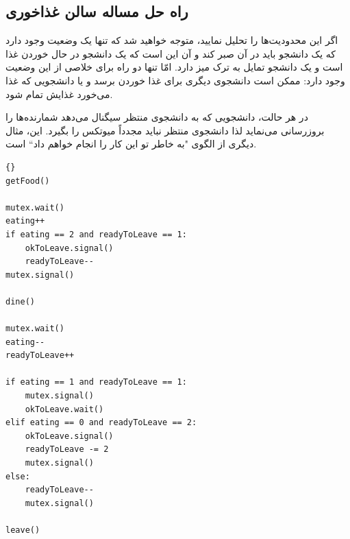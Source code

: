 \documentclass{book}
\newcommand{\clearemptydoublepage}{\newpage\cleardoublepage}
\begin{document}
\clearemptydoublepage
\subsection{راه حل مساله سالن غذاخوری}

    اگر این محدودیت‌ها را تحلیل نمایید، متوجه خواهید شد که تنها یک وضعیت وجود دارد که یک دانشجو باید در آن صبر کند و آن این است که یک 
    دانشجو در حال خوردن غذا است و یک دانشجو تمایل به ترک میز دارد. امّا تنها دو راه برای خلاصی از این وضعیت وجود دارد:
    ممکن است دانشجوی دیگری برای غذا خوردن برسد و یا دانشجویی که غذا می‌خورد غذایش تمام شود. 

    در هر حالت، دانشجویی که به دانشجوی منتظر سیگنال می‌دهد شمارنده‌ها را بروزرسانی می‌نماید لذا دانشجوی منتظر نباید مجدداً میوتکس را بگیرد. 
    این، مثال دیگری از الگوی "به خاطر تو این کار را انجام خواهم داد`` است.

\begin{latin}
\begin{lstlisting}[title=\rl{راه حل مساله سالن غذاخوری}]{}
getFood()

mutex.wait()
eating++
if eating == 2 and readyToLeave == 1:
    okToLeave.signal()
    readyToLeave--
mutex.signal()

dine()

mutex.wait()
eating--
readyToLeave++

if eating == 1 and readyToLeave == 1:
    mutex.signal()
    okToLeave.wait()
elif eating == 0 and readyToLeave == 2:
    okToLeave.signal()
    readyToLeave -= 2
    mutex.signal()
else:
    readyToLeave--
    mutex.signal()

leave()
\end{lstlisting}
\end{latin}
\end{document}
